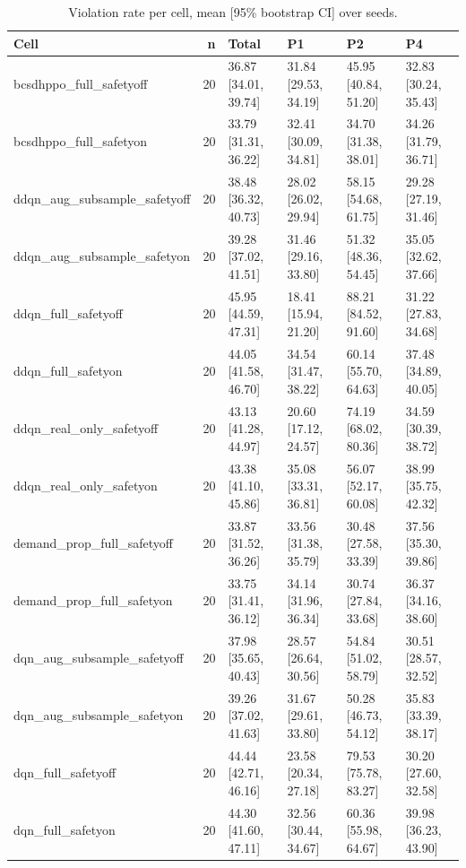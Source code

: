 \begin{table}[t]
\centering
\footnotesize
\caption{Violation rate per cell, mean [95\% bootstrap CI] over seeds.}
\label{tab:cells_v2}
\begin{tabular}{lrllll}
\toprule
Cell & n & Total & P1 & P2 & P4 \\
\midrule
bcsdhppo\_full\_safetyoff & 20 & 36.87 [34.01, 39.74] & 31.84 [29.53, 34.19] & 45.95 [40.84, 51.20] & 32.83 [30.24, 35.43] \\
bcsdhppo\_full\_safetyon & 20 & 33.79 [31.31, 36.22] & 32.41 [30.09, 34.81] & 34.70 [31.38, 38.01] & 34.26 [31.79, 36.71] \\
ddqn\_aug\_subsample\_safetyoff & 20 & 38.48 [36.32, 40.73] & 28.02 [26.02, 29.94] & 58.15 [54.68, 61.75] & 29.28 [27.19, 31.46] \\
ddqn\_aug\_subsample\_safetyon & 20 & 39.28 [37.02, 41.51] & 31.46 [29.16, 33.80] & 51.32 [48.36, 54.45] & 35.05 [32.62, 37.66] \\
ddqn\_full\_safetyoff & 20 & 45.95 [44.59, 47.31] & 18.41 [15.94, 21.20] & 88.21 [84.52, 91.60] & 31.22 [27.83, 34.68] \\
ddqn\_full\_safetyon & 20 & 44.05 [41.58, 46.70] & 34.54 [31.47, 38.22] & 60.14 [55.70, 64.63] & 37.48 [34.89, 40.05] \\
ddqn\_real\_only\_safetyoff & 20 & 43.13 [41.28, 44.97] & 20.60 [17.12, 24.57] & 74.19 [68.02, 80.36] & 34.59 [30.39, 38.72] \\
ddqn\_real\_only\_safetyon & 20 & 43.38 [41.10, 45.86] & 35.08 [33.31, 36.81] & 56.07 [52.17, 60.08] & 38.99 [35.75, 42.32] \\
demand\_prop\_full\_safetyoff & 20 & 33.87 [31.52, 36.26] & 33.56 [31.38, 35.79] & 30.48 [27.58, 33.39] & 37.56 [35.30, 39.86] \\
demand\_prop\_full\_safetyon & 20 & 33.75 [31.41, 36.12] & 34.14 [31.96, 36.34] & 30.74 [27.84, 33.68] & 36.37 [34.16, 38.60] \\
dqn\_aug\_subsample\_safetyoff & 20 & 37.98 [35.65, 40.43] & 28.57 [26.64, 30.56] & 54.84 [51.02, 58.79] & 30.51 [28.57, 32.52] \\
dqn\_aug\_subsample\_safetyon & 20 & 39.26 [37.02, 41.63] & 31.67 [29.61, 33.80] & 50.28 [46.73, 54.12] & 35.83 [33.39, 38.17] \\
dqn\_full\_safetyoff & 20 & 44.44 [42.71, 46.16] & 23.58 [20.34, 27.18] & 79.53 [75.78, 83.27] & 30.20 [27.60, 32.58] \\
dqn\_full\_safetyon & 20 & 44.30 [41.60, 47.11] & 32.56 [30.44, 34.67] & 60.36 [55.98, 64.67] & 39.98 [36.23, 43.90] \\

\end{tabular}
\end{table}
